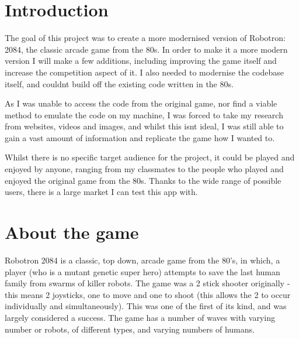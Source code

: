 \section{Introduction}
The goal of this project was to create a more modernised version of Robotron: 2084, the classic arcade game from the 80s. In order to make it a more modern version I will make a few additions, including improving the game itself and increase the competition aspect of it. I also needed to modernise the codebase itself, and couldnt build off the existing code written in the 80s.

As I was unable to access the code from the original game, nor find a viable method to emulate the code on my machine, I was forced to take my research from websites, videos and images, and whilst this isnt ideal, I was still able to gain a vast amount of information and replicate the game how I wanted to.

Whilst there is no specific target audience for the project, it could be played and enjoyed by anyone, ranging from my classmates to the people who played and enjoyed the original game from the 80s. Thanks to the wide range of possible users, there is a large market I can test this app with.

\section{About the game}

Robotron 2084 is a classic, top down, arcade game from the 80's, in which, a player (who is a mutant genetic super hero) attempts to save the last human family from swarms of killer robots. The game was a 2 stick shooter originally - this means 2 joysticks, one to move and one to shoot (this allows the 2 to occur individually and simultaneously). This was one of the first of its kind, and was largely considered a success. The game has a number of waves with varying number or robots, of different types, and varying numbers of humans.

